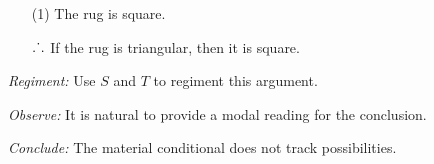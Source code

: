 \documentclass[a4paper, 11pt]{article} %
\def\therefore{\ensuremath{\ldotp\dot{}\,\ldotp}}
\begin{document}
\begin{enumerate}
  \item[(1)] The rug is square.
  \item[\therefore] If the rug is triangular, then it is square.
\end{enumerate}

\noindent
\textit{Regiment:} Use $S$ and $T$ to regiment this argument. 
\vspace{.05in}

\noindent
\textit{Observe:} It is natural to provide a modal reading for the conclusion.
\vspace{.05in}

\noindent
\textit{Conclude:} The material conditional does not track possibilities.




%
%
%
%
%
%
%
%
%
%
%
%
%
%
%
%
%
%
\end{document}
